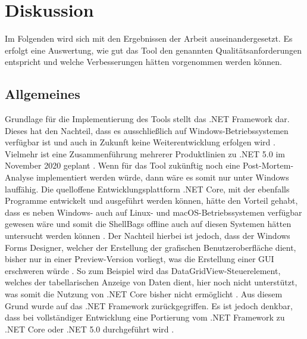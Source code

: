 \section{Diskussion}
\vspace{0.5cm}
Im Folgenden wird sich mit den Ergebnissen der Arbeit auseinandergesetzt. Es erfolgt eine Auswertung, wie gut das Tool den genannten Qualitätsanforderungen entspricht und welche Verbesserungen hätten vorgenommen werden können.
\subsection{Allgemeines}
\vspace{0.3cm}
Grundlage für die Implementierung des Tools stellt das .NET Framework dar. Dieses hat den Nachteil, dass es ausschließlich auf Windows-Betriebssystemen verfügbar ist und auch in Zukunft keine Weiterentwicklung erfolgen wird \cite{netfw,ende}. Vielmehr ist eine Zusammenführung mehrerer Produktlinien zu .NET 5.0 im November 2020 geplant \cite{ende}. Wenn für das Tool zukünftig noch eine Post-Mortem-Analyse implementiert werden würde, dann wäre es somit nur unter Windows lauffähig. Die quelloffene Entwicklungsplattform .NET Core, mit der ebenfalls Programme entwickelt und ausgeführt werden können, hätte den Vorteil gehabt, dass es neben Windows- auch auf Linux- und macOS-Betriebssystemen verfügbar gewesen wäre und somit die ShellBags offline auch auf diesen Systemen hätten untersucht werden können \cite{netcore}. Der Nachteil hierbei ist jedoch, dass der Windows Forms Designer, welcher der Erstellung der grafischen Benutzeroberfläche dient, bisher nur in einer Preview-Version vorliegt, was die Erstellung einer GUI erschweren würde \cite{preview}. So zum Beispiel wird das DataGridView-Steuerelement, welches der tabellarischen Anzeige von Daten dient, hier noch nicht unterstützt, was somit die Nutzung von .NET Core bisher nicht ermöglicht \cite{datagrid,dient}. Aus diesem Grund wurde auf das .NET Framework zurückgegriffen. Es ist jedoch denkbar, dass bei vollständiger Entwicklung eine Portierung vom .NET Framework zu .NET Core oder .NET 5.0 durchgeführt wird \cite{port}.

